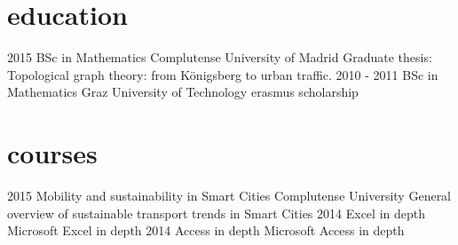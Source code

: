 \documentclass[]{friggeri-cv}
\begin{document}
\section{education}

\begin{entrylist}
  \entry
    {2015}
    {BSc in Mathematics}
    {Complutense University of Madrid}
    {Graduate thesis: Topological graph theory: from Königsberg to urban traffic.}
  \entry
    {2010 - 2011}
    {BSc in Mathematics}
    {Graz University of Technology}
    {erasmus scholarship}
\end{entrylist}

\section{courses}

\begin{entrylist}
  \entry
    {2015}
    {Mobility and sustainability in Smart Cities}
    {Complutense University}
    {General overview of sustainable transport trends in Smart Cities}
  \entry
    {2014}
    {Excel in depth}
    {}
    {Microsoft Excel in depth}
  \entry
    {2014}
    {Access in depth}
    {}
    {Microsoft Access in depth}
\end{entrylist}




\else 

       {}
\end{document}
